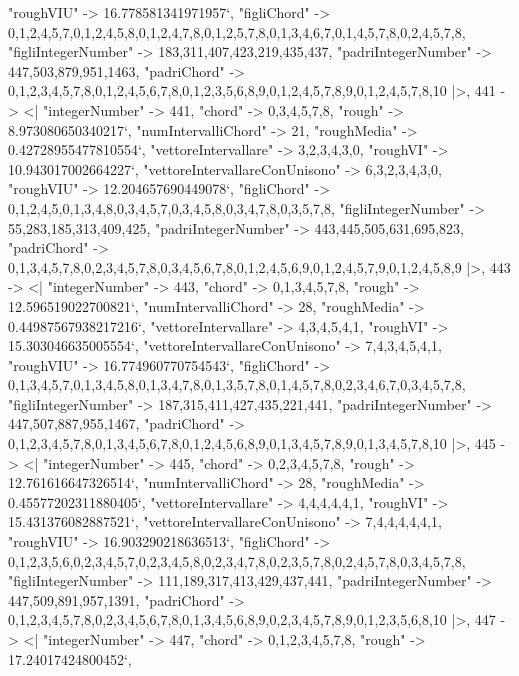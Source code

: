 \documentclass[
]{article}
\begin{document}
\begin{DatasetVerbatim}
    "roughVIU" -> 16.778581341971957`,
    "figliChord" -> {{0,1,2,4,5,7},{0,1,2,4,5,8},{0,1,2,4,7,8},{0,1,2,5,7,8},{0,1,3,4,6,7},{0,1,4,5,7,8},{0,2,4,5,7,8}},
    "figliIntegerNumber" -> {183,311,407,423,219,435,437},
    "padriIntegerNumber" -> {447,503,879,951,1463},
    "padriChord" -> {{0,1,2,3,4,5,7,8},{0,1,2,4,5,6,7,8},{0,1,2,3,5,6,8,9},{0,1,2,4,5,7,8,9},{0,1,2,4,5,7,8,10}}
  |>,
  441 -> <|
    "integerNumber" -> 441,
    "chord" -> {0,3,4,5,7,8},
    "rough" -> 8.973080650340217`,
    "numIntervalliChord" -> 21,
    "roughMedia" -> 0.42728955477810554`,
    "vettoreIntervallare" -> {3,2,3,4,3,0},
    "roughVI" -> 10.943017002664227`,
    "vettoreIntervallareConUnisono" -> {6,3,2,3,4,3,0},
    "roughVIU" -> 12.204657690449078`,
    "figliChord" -> {{0,1,2,4,5},{0,1,3,4,8},{0,3,4,5,7},{0,3,4,5,8},{0,3,4,7,8},{0,3,5,7,8}},
    "figliIntegerNumber" -> {55,283,185,313,409,425},
    "padriIntegerNumber" -> {443,445,505,631,695,823},
    "padriChord" -> {{0,1,3,4,5,7,8},{0,2,3,4,5,7,8},{0,3,4,5,6,7,8},{0,1,2,4,5,6,9},{0,1,2,4,5,7,9},{0,1,2,4,5,8,9}}
  |>,
  443 -> <|
    "integerNumber" -> 443,
    "chord" -> {0,1,3,4,5,7,8},
    "rough" -> 12.596519022700821`,
    "numIntervalliChord" -> 28,
    "roughMedia" -> 0.44987567938217216`,
    "vettoreIntervallare" -> {4,3,4,5,4,1},
    "roughVI" -> 15.303046635005554`,
    "vettoreIntervallareConUnisono" -> {7,4,3,4,5,4,1},
    "roughVIU" -> 16.774960770754543`,
    "figliChord" -> {{0,1,3,4,5,7},{0,1,3,4,5,8},{0,1,3,4,7,8},{0,1,3,5,7,8},{0,1,4,5,7,8},{0,2,3,4,6,7},{0,3,4,5,7,8}},
    "figliIntegerNumber" -> {187,315,411,427,435,221,441},
    "padriIntegerNumber" -> {447,507,887,955,1467},
    "padriChord" -> {{0,1,2,3,4,5,7,8},{0,1,3,4,5,6,7,8},{0,1,2,4,5,6,8,9},{0,1,3,4,5,7,8,9},{0,1,3,4,5,7,8,10}}
  |>,
  445 -> <|
    "integerNumber" -> 445,
    "chord" -> {0,2,3,4,5,7,8},
    "rough" -> 12.761616647326514`,
    "numIntervalliChord" -> 28,
    "roughMedia" -> 0.45577202311880405`,
    "vettoreIntervallare" -> {4,4,4,4,4,1},
    "roughVI" -> 15.431376082887521`,
    "vettoreIntervallareConUnisono" -> {7,4,4,4,4,4,1},
    "roughVIU" -> 16.903290218636513`,
    "figliChord" -> {{0,1,2,3,5,6},{0,2,3,4,5,7},{0,2,3,4,5,8},{0,2,3,4,7,8},{0,2,3,5,7,8},{0,2,4,5,7,8},{0,3,4,5,7,8}},
    "figliIntegerNumber" -> {111,189,317,413,429,437,441},
    "padriIntegerNumber" -> {447,509,891,957,1391},
    "padriChord" -> {{0,1,2,3,4,5,7,8},{0,2,3,4,5,6,7,8},{0,1,3,4,5,6,8,9},{0,2,3,4,5,7,8,9},{0,1,2,3,5,6,8,10}}
  |>,
  447 -> <|
    "integerNumber" -> 447,
    "chord" -> {0,1,2,3,4,5,7,8},
    "rough" -> 17.24017424800452`,

\end{DatasetVerbatim}
\end{document}
